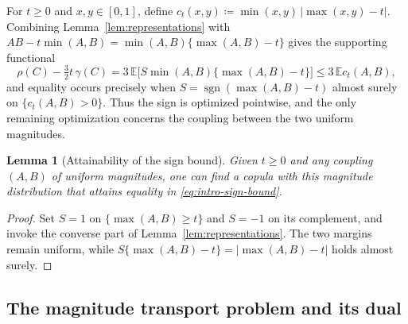 \documentclass{article}
\newtheorem{lemma}[theorem]{Lemma}
\theoremstyle{definition}
\theoremstyle{remark}
\newcommand{\1}{\mathds{1}}
\newcommand{\E}{\mathbb{E}}
\newcommand{\I}{[0,1]}
\DeclareMathOperator{\sgn}{sgn}
\begin{document}
For $t\ge0$ and $x,y\in\I$, define $c_t(x,y)\coloneqq\min(x,y)\,|\max(x,y)-t|$.
Combining Lemma~\ref{lem:representations} with $AB-t\min(A,B)=\min(A,B)\{\max(A,B)-t\}$ gives the supporting functional
\begin{equation}\label{eq:signed-objective}
	\rho(C)-\tfrac32t\,\gamma(C)=3\,\E\bigl[S\min(A,B)\{\max(A,B)-t\}\bigr]\le3\,\E c_t(A,B),
\end{equation}
and equality occurs precisely when $S=\sgn(\max(A,B)-t)$ almost surely on $\{c_t(A,B)>0\}$.
Thus the sign is optimized pointwise, and the only remaining optimization concerns the coupling between the two uniform magnitudes.

\begin{lemma}[Attainability of the sign bound]\label{lem:sign-attainment}
Given $t\ge0$ and any coupling $(A,B)$ of uniform magnitudes, one can find a copula with this magnitude distribution that attains equality in \eqref{eq:intro-sign-bound}.
\end{lemma}

\begin{proof}
Set $S=1$ on $\{\max(A,B)\ge t\}$ and $S=-1$ on its complement, and invoke the converse part of Lemma~\ref{lem:representations}.
The two margins remain uniform, while $S\{\max(A,B)-t\}=|\max(A,B)-t|$ holds almost surely.
\end{proof}

\subsection{The magnitude transport problem and its dual}\label{sec:duality}
\end{document}
